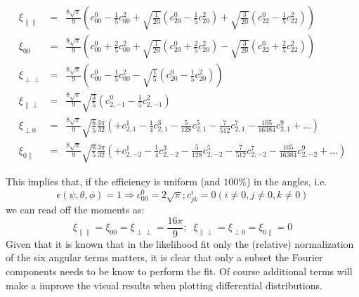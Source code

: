 \documentclass[a4paper,9pt,twoside]{article}
\begin{document}
\begin{eqnarray}
    \xi_{\parallel\parallel} &=& \frac{8 \sqrt{\pi}}{9} \left( c^0_{00}-\frac{1}{5}c^2_{00}+\sqrt{\frac{1}{20}}\left(c^0_{20}-\frac{1}{5}c^2_{20}\right)+\sqrt{\frac{3}{20}}\left(c^0_{22}-\frac{1}{5}c^2_{22}\right)  \right)  \\
    \xi_{00}                 &=& \frac{8 \sqrt{\pi}}{9} \left( c^0_{00}+\frac{2}{5}c^2_{00}+\sqrt{\frac{1}{20}}(c^0_{20}+\frac{2}{5}c^2_{20})-\sqrt{\frac{3}{20}}(c^0_{22}+\frac{2}{5}c^2_{22}) \right) \\
    \xi_{\perp\perp}         &=& \frac{8 \sqrt{\pi}}{9} \left( c^0_{00}-\frac{1}{5}c^2_{00} - \sqrt{\frac{1}{5}}\left(c^0_{20}-\frac{1}{5}c^2_{20}\right)\right)\\
    \xi_{\parallel\perp}     &=& \frac{8 \sqrt{\pi}}{9} \sqrt{\frac{3}{5}}\left(c^0_{2,-1}-\frac{1}{5}c^2_{2,-1}\right)  \\
    \xi_{\perp 0}            &=& \frac{8 \sqrt{\pi}}{9} \sqrt{\frac{6}{5}}\frac{3\pi}{32}\left( +c^1_{2,1} -\frac{1}{4}c^3_{2,1}- \frac{5}{128}c^5_{2,1} -\frac{7}{512}c^7_{2,1} - \frac{105}{16384}c^9_{2,1}+... \right) \\
    \xi_{0\parallel}         &=& \frac{8 \sqrt{\pi}}{9} \sqrt{\frac{6}{5}}\frac{3\pi}{32}\left( +c^1_{2,-2}-\frac{1}{4}c^3_{2,-2}-\frac{5}{128}c^5_{2,-2}-\frac{7}{512}c^7_{2,-2} - \frac{105}{16384}c^9_{2,-2}+... \right) 
\end{eqnarray}

This implies that, if the efficiency is uniform (and $100\%$) in the angles, i.e.
\begin{equation}
   \epsilon(\psi,\theta,\phi) = 1 \Rightarrow c^0_{00} = 2\sqrt{\pi} ; c^{i}_{jk} = 0 (i\neq 0, j\neq 0, k \neq 0)
\end{equation}
we can read off the moments as:
\begin{equation}
    \xi_{\parallel\parallel}= \xi_{00}= \xi_{\perp\perp}  = \frac{16\pi}{9};\;\; \xi_{\parallel\perp} =\xi_{\perp 0} = \xi_{0\parallel} = 0
\end{equation}
Given that it is known that  in the likelihood fit only the (relative) normalization of the six angular
terms matters, it is clear that only a subset the Fourier components needs to be know to
perform the fit. Of course additional terms will make a improve the visual results when plotting 
differential distributions. 



\end{document}
